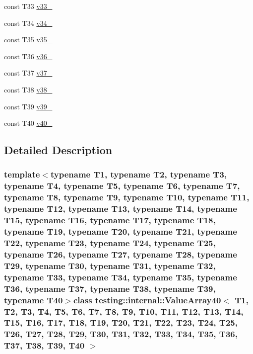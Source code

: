 \begin{DoxyCompactItemize}
\item 
const \-T33 \hyperlink{classtesting_1_1internal_1_1ValueArray40_a7a6cefe370b709c3a7b35b6d5ca8c778}{v33\-\_\-}
\item 
const \-T34 \hyperlink{classtesting_1_1internal_1_1ValueArray40_ab379e4d515d66bc57e05267515fab1d9}{v34\-\_\-}
\item 
const \-T35 \hyperlink{classtesting_1_1internal_1_1ValueArray40_a0a36112ac9b7a13572874977627ed192}{v35\-\_\-}
\item 
const \-T36 \hyperlink{classtesting_1_1internal_1_1ValueArray40_a531a52e3e8de6e982edd23c2547e4c49}{v36\-\_\-}
\item 
const \-T37 \hyperlink{classtesting_1_1internal_1_1ValueArray40_a2c4a91368c3edf933948acb4996a833d}{v37\-\_\-}
\item 
const \-T38 \hyperlink{classtesting_1_1internal_1_1ValueArray40_a364bf323d933a4adac3a9b46952ae1d3}{v38\-\_\-}
\item 
const \-T39 \hyperlink{classtesting_1_1internal_1_1ValueArray40_a0bd84ae118aa56fd251e494d1abc19fb}{v39\-\_\-}
\item 
const \-T40 \hyperlink{classtesting_1_1internal_1_1ValueArray40_ac99de9e6d59182db6141430e54f51e9c}{v40\-\_\-}
\end{DoxyCompactItemize}


\subsection{\-Detailed \-Description}
\subsubsection*{template$<$typename T1, typename T2, typename T3, typename T4, typename T5, typename T6, typename T7, typename T8, typename T9, typename T10, typename T11, typename T12, typename T13, typename T14, typename T15, typename T16, typename T17, typename T18, typename T19, typename T20, typename T21, typename T22, typename T23, typename T24, typename T25, typename T26, typename T27, typename T28, typename T29, typename T30, typename T31, typename T32, typename T33, typename T34, typename T35, typename T36, typename T37, typename T38, typename T39, typename T40$>$class testing\-::internal\-::\-Value\-Array40$<$ T1, T2, T3, T4, T5, T6, T7, T8, T9, T10, T11, T12, T13, T14, T15, T16, T17, T18, T19, T20, T21, T22, T23, T24, T25, T26, T27, T28, T29, T30, T31, T32, T33, T34, T35, T36, T37, T38, T39, T40 $>$}




